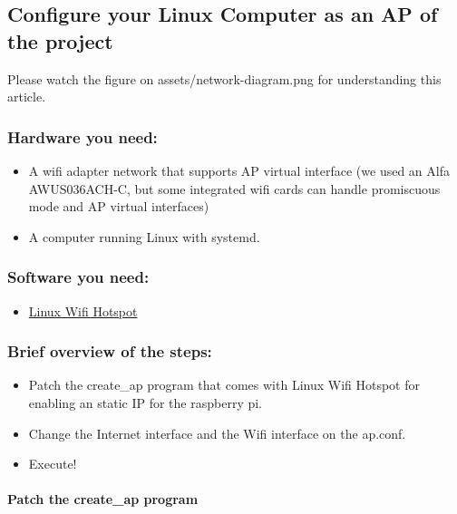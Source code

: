 \subsection{Configure your Linux Computer as an AP of the
project}\label{configure-your-linux-computer-as-an-ap-of-the-project}

Please watch the figure on assets/network-diagram.png for understanding
this article.

\subsubsection{Hardware you need:}\label{hardware-you-need}

\begin{itemize}
\item
  A wifi adapter network that supports AP virtual interface (we used an
  Alfa AWUS036ACH-C, but some integrated wifi cards can handle
  promiscuous mode and AP virtual interfaces)
\item
  A computer running Linux with systemd.
\end{itemize}

\subsubsection{Software you need:}\label{software-you-need}

\begin{itemize}
\item
  \href{https://github.com/lakinduakash/linux-wifi-hotspot}{Linux Wifi
  Hotspot}
\end{itemize}

\subsubsection{Brief overview of the
steps:}\label{brief-overview-of-the-steps}

\begin{itemize}
\item
  Patch the create\_ap program that comes with Linux Wifi Hotspot for
  enabling an static IP for the raspberry pi.
\item
  Change the Internet interface and the Wifi interface on the ap.conf.
\item
  Execute!
\end{itemize}

\paragraph{Patch the create\_ap
program}\label{patch-the-create_ap-program}

